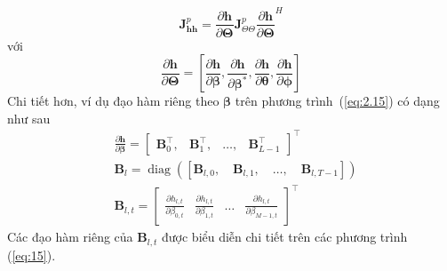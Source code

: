 \begin{equation}
\label{eq:13}
    \mathbf{J}^p_{\mathbf{h} \mathbf{h}}=\frac{\partial \mathbf{h}}{\partial \boldsymbol{\Theta}} \mathbf{J}^p_{\Theta \Theta} {\frac{\partial \mathbf{h}}{\partial \boldsymbol{\Theta}}}^{H}
\end{equation}
với 
\begin{equation}
\label{eq:2.15}
    \frac{\partial \mathbf{h}}{\partial \boldsymbol{\Theta}}=
    \left[\frac{\partial \mathbf{h}}{\partial \boldsymbol{\beta}}, 
    \frac{\partial \mathbf{h}}{\partial \boldsymbol{\beta^*}},
    \frac{\partial \mathbf{h}}{\partial \boldsymbol{\theta}}, 
    \frac{\partial \mathbf{h}}{\partial \boldsymbol{\phi}}\right]
\end{equation}
Chi tiết hơn, ví dụ đạo hàm riêng theo $\boldsymbol{\beta}$ trên phương trình~(\ref{eq:2.15}) có dạng như sau
\begin{subequations}
    \begin{align}
    &\frac{\partial \mathbf{h}}{\partial \boldsymbol{\beta}}=
    \left[\begin{array}{llll}
        \boldsymbol{B}_{0}^{\top}, & \boldsymbol{B}_{1}^{\top}, & \ldots, & \boldsymbol{B}_{L - 1}^{\top}
    \end{array}\right]^{\top}\\
    &\boldsymbol{B}_{l}=\operatorname{diag}\left(\left[\boldsymbol{B}_{l, 0}, \quad \boldsymbol{B}_{l, 1}, \quad \ldots, \quad \boldsymbol{B}_{l, T - 1}\right]\right) \\
    &\boldsymbol{B}_{l, t}=\left[\begin{array}{cccc}
        \frac{\partial h_{l, t}}{\partial \beta_{0, t}} &
        \frac{\partial h_{l, t}}{\partial \beta_{1, t}} & 
        \ldots & 
        \frac{\partial h_{l, t}}{\partial \beta_{M-1, t}}
    \end{array}\right]^\top
    \end{align}
\end{subequations}
Các đạo hàm riêng của $\boldsymbol{B}_{l,t}$ được biểu diễn chi tiết trên các phương trình (\ref{eq:15}).


